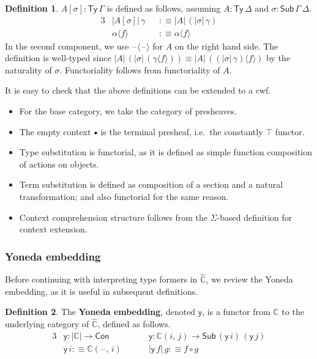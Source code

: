 \documentclass[12pt,a4paper,twoside,openany]{book}
\theoremstyle{remark}
\theoremstyle{definition}
\newtheorem{mydefinition}{Definition}
\theoremstyle{theorem}
\newcommand{\ms}[1]{\mathsf{#1}}
\newcommand{\mbb}[1]{\mathbb{#1}}
\newcommand{\Con}{\mathsf{Con}}
\newcommand{\Sub}{\mathsf{Sub}}
\newcommand{\Ty}{\mathsf{Ty}}
\newcommand{\blank}{\mathord{\hspace{1pt}\text{--}\hspace{1pt}}}
\newcommand{\emptycon}{\scaleobj{.75}\bullet}
\newcommand{\mbbC}{\mbb{C}}
\newcommand{\hmbbC}{\hat{\mbb{C}}}
\newcommand{\lab}{\langle}
\newcommand{\rab}{\rangle}
\newcommand{\defn}{:\equiv}
\newcommand{\yon}{\ms{y}}
\begin{document}
\begin{mydefinition}
$A[\sigma] : \Ty\,\Gamma$ is defined as follows, assuming
$A : \Ty\,\Delta$ and $\sigma : \Sub\,\Gamma\,\Delta$.
\begin{alignat*}{3}
  & |A[\sigma]|\,\gamma &&\defn |A|\,(|\sigma|\,\gamma) \\
  & \alpha \lab f \rab &&\defn \alpha \lab f \rab
\end{alignat*}
In the second component, we use $\blank\!\lab\!\blank\!\rab$ for $A$ on the right hand
side.  The definition is well-typed since $|A|\,(|\sigma|\,(\gamma\lab f \rab))
\equiv |A|\,((|\sigma|\,\gamma)\lab f \rab)$ by the naturality of
$\sigma$. Functoriality follows from functoriality of $A$.
\end{mydefinition}

It is easy to check that the above definitions can be extended to a cwf.
\begin{itemize}
  \item For the base category, we take the category of presheaves.
  \item The empty context $\emptycon$ is the terminal presheaf, i.e.\ the
        constantly $\top$ functor.
  \item Type substitution is functorial, as it is defined as simple function
    composition of actions on objects.
  \item Term substitution is defined as composition of a section and
    a natural transformation; and also functorial for the same reason.
  \item Context comprehension structure follows from the $\Sigma$-based definition for
    context extension.
\end{itemize}

\subsubsection{Yoneda embedding}

Before continuing with interpreting type formers in $\hmbbC$, we review the
Yoneda embedding, as it is useful in subsequent definitions.

\begin{mydefinition}
The \textbf{Yoneda embedding}, denoted $\ms{y}$, is a functor from $\mbbC$ to
the underlying category of $\hmbbC$, defined as follows.
\begin{alignat*}{3}
  & \yon : |\mbbC| \to \Con \hspace{3em}&& \yon : \mbbC(i,\,j) \to \Sub\,(\yon\,i)\,(\yon\,j)\\
  & \yon\,i \defn \mbbC(\blank,\,i) && |\yon\,f|\,g \defn f \circ g
\end{alignat*}
\end{mydefinition}
\end{document}
